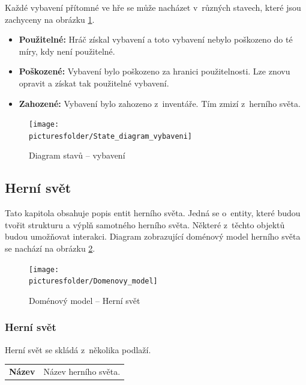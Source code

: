 \documentclass[12pt,a4paper]{article}
\def\picturesfolder{obrazky}
\begin{document}
Každé vybavení přítomné ve hře se může nacházet v~různých stavech, které jsou
zachyceny na obrázku \ref{stavy:vybaveni}.

\begin {itemize}
\item{\textbf{Použitelné:} Hráč získal vybavení a toto vybavení nebylo poškozeno
  do té míry, kdy není použitelné.}
\item{\textbf{Poškozené:} Vybavení bylo poškozeno za hranici použitelnosti. Lze
  znovu opravit a získat tak použitelné vybavení.}
\item{\textbf{Zahozené:} Vybavení bylo zahozeno z~inventáře. Tím zmizí z~herního
  světa.}
\end {itemize}

\begin{figure}
\begin{center}
  \texttt{[image: \\picturesfolder/State\_diagram\_vybaveni]}
  \caption{Diagram stavů -- vybavení}
  \label{stavy:vybaveni}
\end{center}
\end{figure}

\subsection{Herní svět}
Tato kapitola obsahuje popis entit herního světa. Jedná se o~entity, které budou
tvořit strukturu a výplň samotného herního světa. Některé z~těchto objektů budou
umožňovat interakci.  Diagram zobrazující doménový model herního světa se
nachází na obrázku \ref{domenovy:hra}.

\begin{figure}
\begin{center}
  \texttt{[image: \\picturesfolder/Domenovy\_model]}
  \caption{Doménový model -- Herní svět}
  \label{domenovy:hra}
\end{center}
\end{figure}

\subsubsection{Herní svět}
Herní svět se skládá z~několika podlaží.\\[5pt]

\begin{tabular*}{0.4\textwidth}{ll}
  \bf Název & Název herního světa.\\[7pt]
\end{tabular*}
\end{document}

